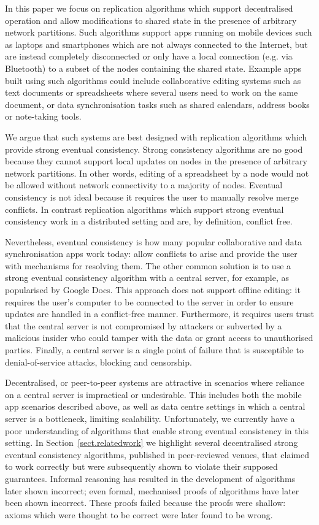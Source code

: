 \documentclass[acmlarge,review,anonymous]{acmart}\settopmatter{printfolios=true}
\begin{document}
In this paper we focus on replication algorithms which support decentralised operation and allow modifications to shared state in the presence of arbitrary network partitions.
Such algorithms support apps running on mobile devices such as laptops and smartphones which are not always connected to the Internet, but are instead completely disconnected or only have a local connection (e.g. via Bluetooth) to a subset of the nodes containing the shared state.
Example apps built using such algorithms could include collaborative editing systems such as text documents or spreadsheets where several users need to work on the same document, or data synchronisation tasks such as shared calendars, address books or note-taking tools.

We argue that such systems are best designed with replication algorithms which provide strong eventual consistency. Strong consistency algorithms are no good because they cannot support local updates on nodes in the presence of arbitrary network partitions.
In other words, editing of a spreadsheet by a node would not be allowed without network connectivity to a majority of nodes.
Eventual consistency is not ideal because it requires the user to manually resolve merge conflicts.
In contrast replication algorithms which support strong eventual consistency work in a distributed setting and are, by definition, conflict free.

Nevertheless, eventual consistency is how many popular collaborative and data synchronisation apps work today: allow
conflicts to arise and provide the user with mechanisms for resolving them.
The other common solution is to use a strong eventual consistency algorithm with a central server, for example, as popularised by Google Docs.
This approach does not support offline editing: it requires the user's computer to be connected to the server in order to ensure updates are handled in a conflict-free manner.
Furthermore, it requires users trust that the central server is not compromised by attackers or subverted by a malicious insider who could tamper with the data or grant access to unauthorised parties.
Finally, a central server is a single point of failure that is susceptible to denial-of-service attacks, blocking and censorship.

Decentralised, or peer-to-peer systems are attractive in scenarios where reliance on a central server is impractical or undesirable.
This includes both the mobile app scenarios described above, as well as data centre settings in which a central server is a bottleneck, limiting scalability.
Unfortunately, we currently have a poor understanding of algorithms that enable strong eventual consistency in this setting.
In Section~\ref{sect.relatedwork} we highlight several decentralised strong eventual consistency algorithms, published in peer-reviewed venues, that claimed to work correctly but were subsequently shown to violate their supposed guarantees. 
Informal reasoning has resulted in the development of algorithms later shown incorrect; even formal, mechanised proofs of algorithms have later been shown incorrect.
These proofs failed because the proofs were shallow: axioms which were thought to be correct were later found to be wrong.
\end{document}
